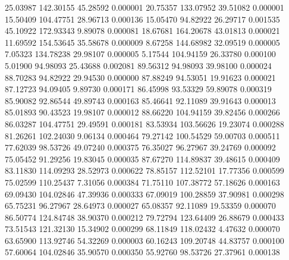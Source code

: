        25.03987      142.30155       45.28592       0.000001
       20.75357      133.07952       39.51082       0.000001
       15.50409      104.47751       28.96713       0.000136
       15.05470       94.82922       26.29717       0.001535
       45.10922      172.93343        9.89078       0.000081
       18.67681      164.20678       43.01813       0.000021
       11.69592      154.53645       35.58678       0.000009
	8.67258      144.68982       32.09519       0.000005
	7.05323      134.78238       29.98107       0.000005
	5.17544      104.94159       26.33780       0.000100
	5.01900       94.98093       25.43688       0.002081
       89.56312       94.98093       39.98100       0.000024
       88.70283       94.82922       29.94530       0.000000
       87.88249       94.53051       19.91623       0.000021
       87.12723       94.09405        9.89730       0.000171
       86.45998       93.53329       59.89078       0.000319
       85.90082       92.86544       49.89743       0.000163
       85.46641       92.11089       39.91643       0.000013
       85.01893       90.43523       19.98107       0.000012
       88.66220      104.94159       39.82456       0.000266
       86.03287      104.47751       29.49591       0.000181
       83.53934      103.56626       19.23074       0.000288
       81.26261      102.24030        9.06134       0.000464
       79.27142      100.54529       59.00703       0.000511
       77.62039       98.53726       49.07240       0.000375
       76.35027       96.27967       39.24769       0.000092
       75.05452       91.29256       19.83045       0.000035
       87.67270      114.89837       39.48615       0.000409
       83.11830      114.09293       28.52973       0.000622
       78.85157      112.52101       17.77356       0.000599
       75.02599      110.25437        7.31056       0.000384
       71.75110      107.38772       57.18626       0.000163
       69.09430      104.02846       47.39936       0.000333
       67.09019      100.28859       37.90981       0.000298
       65.75231       96.27967       28.64973       0.000027
       65.08357       92.11089       19.53359       0.000070
       86.50774      124.84748       38.90370       0.000212
       79.72794      123.64409       26.88679       0.000433
       73.51543      121.32130       15.34902       0.000299
       68.11849      118.02432        4.47632       0.000070
       63.65900      113.92746       54.32269       0.000003
       60.16243      109.20748       44.83757       0.000100
       57.60064      104.02846       35.90570       0.000350
       55.92760       98.53726       27.37961       0.000138
